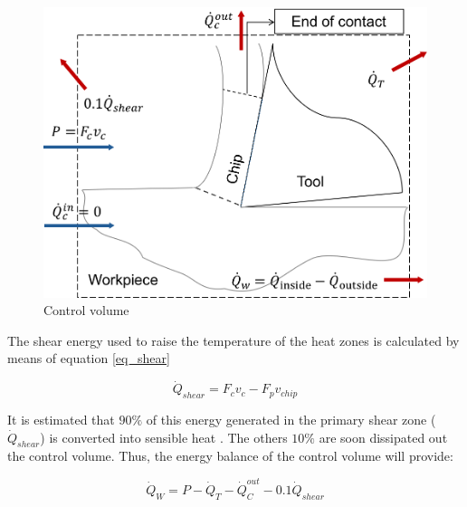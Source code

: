 		\begin{figure}[H]
			\centering
			\captionsetup{justification=centering}
			\includegraphics[scale=0.6]{Imagens/volumeControl.png}
			\caption{Control volume}
			\label{fig:volControl}
		\end{figure}

		The shear energy used to raise the temperature of the heat zones is calculated by means of equation \ref{eq_shear}

		\begin{equation} 
		\label{eq_shear}
		\dot{Q}_{shear} = F_{c}v_{c} - F_{p}v_{chip}
		\end{equation}

		It is estimated that $90\%$ of this energy generated in the primary shear zone ($\dot{Q}_{shear}$) is converted into sensible heat \cite{trigger1942}. The others $10\%$ are soon dissipated out the control volume. Thus, the energy balance of the control volume will provide:

		\begin{equation} 
		\label{eq_energybalance}
		\dot{Q}_{W} = P - \dot{Q}_{T} - \dot{Q}_{C}^{out} - 0.1\dot{Q}_{shear}
		\end{equation}
